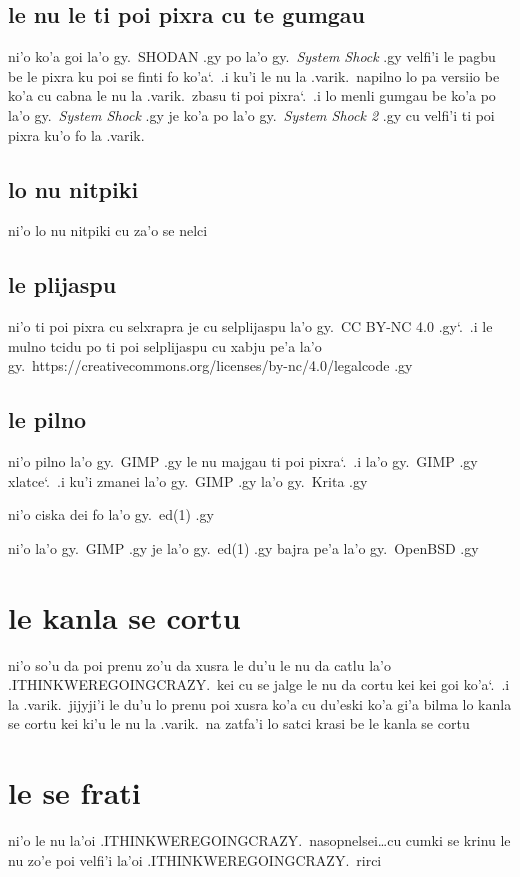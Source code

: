 \documentclass{report}
\newcommand\sds{\spacefactor\sfcode`.\ \space}
\begin{document}
\subsection{le nu le ti poi pixra cu te gumgau}
ni'o ko'a goi la'o gy.\ SHODAN .gy po la'o gy.\ \textit{System Shock} .gy velfi'i le pagbu be le pixra ku poi se finti fo ko'a\sds  .i ku'i le nu la .varik.\ napilno lo pa versiio be ko'a cu cabna le nu la .varik.\ zbasu ti poi pixra\sds  .i lo menli gumgau be ko'a po la'o gy.\ \textit{System Shock} .gy je ko'a po la'o gy.\ \textit{System Shock 2} .gy cu velfi'i ti poi pixra ku'o fo la .varik.
\subsection{lo nu nitpiki}
ni'o lo nu nitpiki cu za'o se nelci

\subsection{le plijaspu}
ni'o ti poi pixra cu selxrapra je cu selplijaspu la'o gy.\ CC BY-NC 4.0 .gy\sds  .i le mulno tcidu po ti poi selplijaspu cu xabju pe'a la'o gy.\ https://creativecommons.org/licenses/by-nc/4.0/legalcode .gy

\subsection{le pilno}
ni'o pilno la'o gy.\ GIMP .gy le nu majgau ti poi pixra\sds  .i  la'o gy.\ GIMP .gy xlatce\sds  .i ku'i zmanei la'o gy.\ GIMP .gy la'o gy.\ Krita .gy

ni'o ciska dei fo la'o gy.\ ed(1) .gy

ni'o la'o gy.\ GIMP .gy je la'o gy.\ ed(1) .gy bajra pe'a la'o gy.\ OpenBSD .gy

\section{le kanla se cortu}
ni'o so'u da poi prenu zo'u da xusra le du'u le nu da catlu la'o .ITHINKWEREGOINGCRAZY.\ kei cu se jalge le nu da cortu kei kei goi ko'a\sds  .i la .varik.\ jijyji'i le du'u lo prenu poi xusra ko'a cu du'eski ko'a gi'a bilma lo kanla se cortu kei ki'u le nu la .varik.\ na zatfa'i lo satci krasi be le kanla se cortu

\section{le se frati}
ni'o le nu la'oi .ITHINKWEREGOINGCRAZY.\ nasopnelsei\ldots cu cumki se krinu le nu zo'e poi velfi'i la'oi .ITHINKWEREGOINGCRAZY.\ rirci
\end{document}
